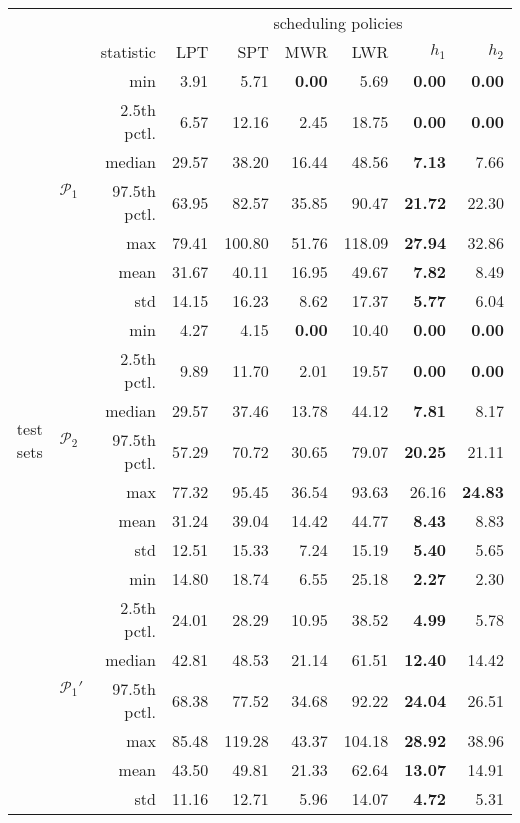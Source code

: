 \begin{tabular}{c|l|r|rrrrrr|}
\multicolumn{3}{c}{}&\multicolumn{6}{c}{scheduling policies}\\
\cline{4-9}
\multicolumn{2}{c}{}&statistic&LPT&SPT&MWR&LWR&$h_1$&$h_2$\\
\cline{2-9}
\multirow{21}{*}{\begin{sideways}test sets\end{sideways}}
&\multirow{7}{*}{$\mathcal{P}_1$}&min& 3.91& 5.71& {\bf 0.00}& 5.69& {\bf 0.00}& {\bf 0.00} \\
&&2.5th pctl.& 6.57& 12.16& 2.45& 18.75& {\bf 0.00}& {\bf 0.00} \\
&&median& 29.57& 38.20& 16.44& 48.56& {\bf 7.13}& 7.66 \\
&&97.5th pctl.& 63.95& 82.57& 35.85& 90.47& {\bf 21.72}& 22.30 \\
&&max& 79.41& 100.80& 51.76& 118.09& {\bf 27.94}& 32.86 \\
&&mean& 31.67& 40.11& 16.95& 49.67& {\bf 7.82}& 8.49 \\
&&std& 14.15& 16.23& 8.62& 17.37& {\bf 5.77}& 6.04 \\
\cline{2-9}
&\multirow{7}{*}{$\mathcal{P}_2$}&min& 4.27& 4.15& {\bf 0.00}& 10.40& {\bf 0.00}& {\bf 0.00} \\
&&2.5th pctl.& 9.89& 11.70& 2.01& 19.57& {\bf 0.00}& {\bf 0.00} \\
&&median& 29.57& 37.46& 13.78& 44.12& {\bf 7.81}& 8.17 \\
&&97.5th pctl.& 57.29& 70.72& 30.65& 79.07& {\bf 20.25}& 21.11 \\
&&max& 77.32& 95.45& 36.54& 93.63& 26.16& {\bf 24.83 }\\
&&mean& 31.24& 39.04& 14.42& 44.77& {\bf 8.43}& 8.83 \\
&&std& 12.51& 15.33& 7.24& 15.19& {\bf 5.40}& 5.65 \\
\cline{2-9}
&\multirow{7}{*}{$\mathcal{P}_1'$}&min& 14.80& 18.74& 6.55& 25.18&{\bf 2.27}& 2.30 \\
&&2.5th pctl.& 24.01& 28.29& 10.95& 38.52& {\bf 4.99}& 5.78 \\
&&median& 42.81& 48.53& 21.14& 61.51& {\bf 12.40}& 14.42 \\
&&97.5th pctl.& 68.38& 77.52& 34.68& 92.22& {\bf 24.04}& 26.51 \\
&&max& 85.48& 119.28& 43.37& 104.18& {\bf 28.92}& 38.96 \\
&&mean& 43.50& 49.81& 21.33& 62.64& {\bf 13.07}& 14.91 \\
&&std& 11.16& 12.71& 5.96& 14.07& {\bf 4.72}& 5.31 \\
\cline{2-9}
\end{tabular}
